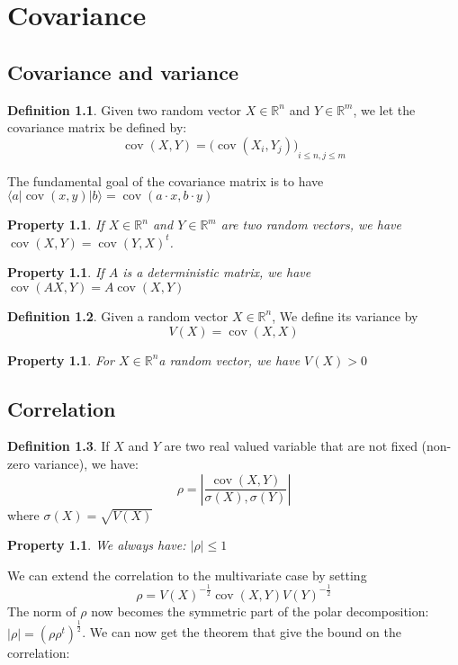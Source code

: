 \documentclass[10pt]{report}
\theoremstyle{plain}
\newtheorem{prop}[thm]{Property}
\theoremstyle{definition}
\newtheorem{defn}{Definition}[chapter]
\theoremstyle{remark}
\newcommand{\R}{\ensuremath{\mathbb{R}}}
\newcommand{\ket}[1]{|#1\rangle}
\newcommand{\bra}[1]{\langle#1|}
\renewcommand{\leq}{\leqslant}
\DeclareMathOperator{\cov}{cov}
\begin{document}
\chapter{Covariance}\label{app:cov}

\section{Covariance and variance}

\begin{defn}
  Given two random vector $X \in \R^n$ and $Y \in \R^m$, we let the covariance
  matrix be defined by:
  \[\cov(X,Y) = {\big(\cov(X_i,Y_j)\big)}_{i \leq n, j \leq m}\]
\end{defn}

The fundamental goal of the covariance matrix is to have $\bra a \cov(x,y) \ket
b = \cov(a \cdot x, b \cdot y)$
\begin{prop} If $X \in \R^n$ and $Y \in \R^m$ are two random vectors, we have $\cov(X,Y) = {\cov(Y,X)}^t$.
\end{prop}
\begin{prop} If $A$ is a deterministic matrix, we have $ \cov(A X, Y) = A \cov(X,Y)$
\end{prop}

\begin{defn}
  Given a random vector $X \in \R^n$, We define its variance by
  \[V(X) = \cov(X,X)\]
\end{defn}

\begin{prop} For $X \in \R^n$a random vector, we have $V(X) > 0$
\end{prop}

\section{Correlation}\label{sec:correl}

\begin{defn}
  If $X$ and $Y$ are two real valued variable that are not fixed (non-zero
  variance), we have:
  \[\rho = \left|\frac {\cov(X,Y)}{\sigma(X),\sigma(Y)}\right|\]
  where $\sigma(X) = \sqrt{V(X)}$
\end{defn}

\begin{prop}\label{prop:correl1}
  We always have: $|\rho| \le 1$
\end{prop}

We can extend the correlation to the multivariate case by setting
\[\rho = {V(X)}^{-\frac12}\cov(X,Y){V(Y)}^{-\frac12}\]
The norm of $\rho$ now becomes the symmetric part of the polar decomposition:  $|\rho|
= {(\rho\rho^t)}^{\frac12}$. We can now get the theorem that give the bound on the
correlation:
\end{document}

